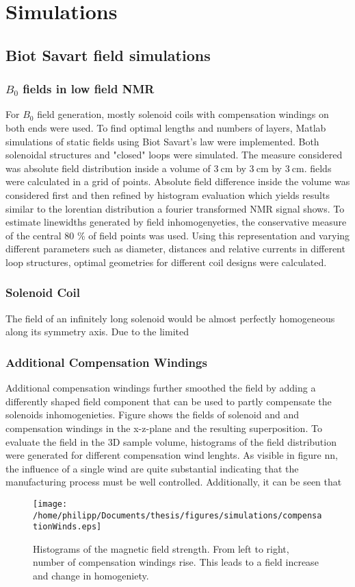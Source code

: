 \chapter{Simulations}\label{chapter:simulations}
\section{Biot Savart field simulations}
	\subsection{$B_0$ fields in low field NMR}
		For $B_0$ field generation, mostly solenoid coils with compensation windings on both ends
		were used. To find optimal lengths and numbers of layers, Matlab simulations of static fields using Biot Savart's law were implemented.
		Both solenoidal structures and "closed" loops were simulated.
		The measure considered was absolute field distribution inside a volume of
		$\SI{3}{\centi\meter}$ by  $\SI{3}{\centi\meter}$ by $\SI{3}{\centi\meter}$. 
		fields were calculated in a grid of  points. Absolute field difference inside the volume was considered first and then refined by
		histogram evaluation which yields results similar to the lorentian distribution a fourier transformed NMR signal shows. To estimate linewidths generated by field inhomogenyeties, the conservative measure of the central 80 \% of field points was used.
		Using this representation and varying different parameters such as diameter, distances and relative currents in different loop structures, optimal geometries for different coil designs were calculated.
		\subsection{Solenoid Coil}
			The field of an infinitely long solenoid would be almost perfectly homogeneous along its symmetry axis. Due to the limited
		\subsection{Additional Compensation Windings}
			Additional compensation windings further smoothed the field by adding a differently shaped field component that can be used to partly compensate the solenoids inhomogenieties. Figure  shows the fields of solenoid and and compensation windings in the x-z-plane and the resulting superposition.
			To evaluate the field in the 3D sample volume, histograms of the field distribution were generated for different compensation wind lenghts. As visible in figure nn, the influence of a single wind are quite substantial indicating that the manufacturing process must be well controlled. Additionally, it can be seen that
			\begin{figure}[b]
				\centering
				\texttt{[image: /home/philipp/Documents/thesis/figures/simulations/compensationWinds.eps]}
				\caption{Histograms of the magnetic field strength. From left to right, number of compensation windings rise. This leads to a field increase and change in homogeniety.}
			\end{figure}

